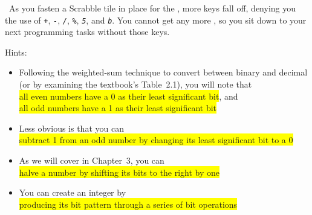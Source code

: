 \transitiontwo\
As you fasten a Scrabble tile in place for the \textit{\texttt{\missingKey}}, more keys fall off, denying you the use of \textit{\texttt{+}}, \textit{\texttt{-}}, \textit{\texttt{/}}, \textit{\texttt{\%}}, \textit{\texttt{5}}, and \textit{\texttt{b}}.
You cannot get any more \adhesive, so you sit down to your next programming tasks without those keys.

\begin{description}
\end{description}

Hints:
\begin{itemize}
    \item Following the weighted-sum technique to convert between binary and decimal (or by examining the textbook's Table~2.1), you will note that \\ \colorbox{yellow}{all even numbers have a 0 as their least significant bit}, and \\ \colorbox{yellow}{all odd numbers have a 1 as their least significant bit}
    \item Less obvious is that you can \\ \colorbox{yellow}{subtract 1 from an odd number by changing its least significant bit to a 0}
    \item As we will cover in Chapter~3, you can \\ \colorbox{yellow}{halve a number by shifting its bits to the right by one}
    \item You can create an integer by \\ \colorbox{yellow}{producing its bit pattern through a series of bit operations}
\end{itemize}

